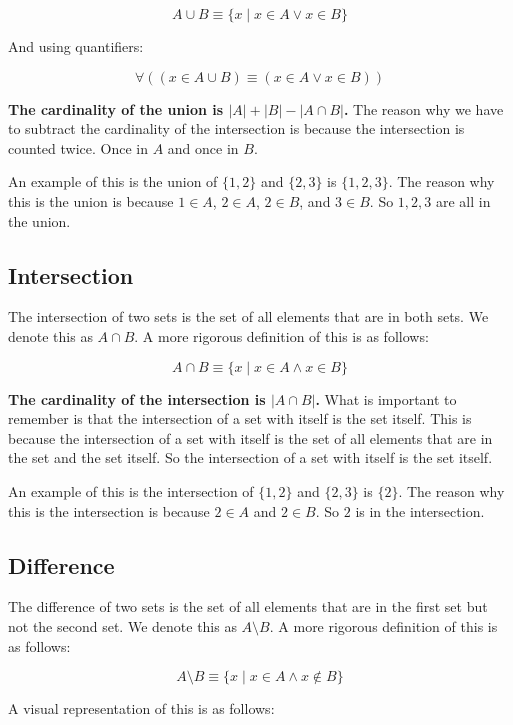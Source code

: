 \documentclass[11pt]{article}
\begin{document}
\[
A \cup B \equiv \{x \mid x \in A \lor x \in B\}
\]

And using quantifiers:

\[
\forall ((x \in A \cup B) \equiv (x \in A \lor x \in B))
\]


\textbf{The cardinality of the union is \(|A| + |B| - |A \cap B|\).} The reason why we have to subtract the cardinality of the intersection is because the intersection is counted twice. Once in \(A\) and once in \(B\).

An example of this is the union of \(\{1,2\}\) and \(\{2,3\}\) is \(\{1,2,3\}\). The reason why this is the union is because \(1 \in A\), \(2 \in A\), \(2 \in B\), and \(3 \in B\). So \(1,2,3\) are all in the union.

\subsection{Intersection}
\label{sec:org93fb782}
The intersection of two sets is the set of all elements that are in both sets. We denote this as \(A \cap B\). A more rigorous definition of this is as follows:

\[
A \cap B \equiv \{x \mid x \in A \land x \in B\}
\]

\textbf{The cardinality of the intersection is \(|A \cap B|\).} What is important to remember is that the intersection of a set with itself is the set itself. This is because the intersection of a set with itself is the set of all elements that are in the set and the set itself. So the intersection of a set with itself is the set itself.

An example of this is the intersection of \(\{1,2\}\) and \(\{2,3\}\) is \(\{2\}\). The reason why this is the intersection is because \(2 \in A\) and \(2 \in B\). So \(2\) is in the intersection.

\subsection{Difference}
\label{sec:org921e6e4}
The difference of two sets is the set of all elements that are in the first set but not the second set. We denote this as \(A \setminus B\). A more rigorous definition of this is as follows:

\[
A \setminus B \equiv \{x \mid x \in A \land x \notin B\}
\]

A visual representation of this is as follows:
\end{document}

